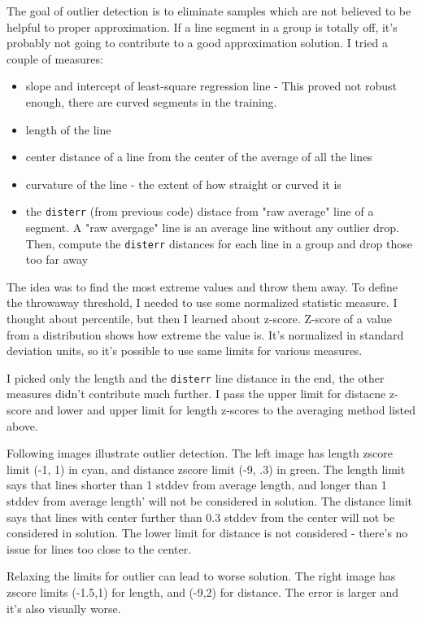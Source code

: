 \documentclass[11pt]{article}
\providecommand{\tightlist}{%
      \setlength{\itemsep}{0pt}\setlength{\parskip}{0pt}}
\begin{document}
The goal of outlier detection is to eliminate samples which are not
believed to be helpful to proper approximation. If a line segment in a
group is totally off, it's probably not going to contribute to a good
approximation solution. I tried a couple of measures:

\begin{itemize}
\tightlist
\item
  slope and intercept of least-square regression line - This proved not
  robust enough, there are curved segments in the training.
\item
  length of the line
\item
  center distance of a line from the center of the average of all the
  lines
\item
  curvature of the line - the extent of how straight or curved it is
\item
  the \texttt{disterr} (from previous code) distace from "raw average"
  line of a segment. A "raw avergage" line is an average line without
  any outlier drop. Then, compute the \texttt{disterr} distances for
  each line in a group and drop those too far away
\end{itemize}

The idea was to find the most extreme values and throw them away. To
define the throwaway threshold, I needed to use some normalized
statistic measure. I thought about percentile, but then I learned about
z-score. Z-score of a value from a distribution shows how extreme the
value is. It's normalized in standard deviation units, so it's possible
to use same limits for various measures.

I picked only the length and the \texttt{disterr} line distance in the
end, the other measures didn't contribute much further. I pass the upper
limit for distacne z-score and lower and upper limit for length z-scores
to the averaging method listed above.

Following images illustrate outlier detection. The left image has length
zscore limit (-1, 1) in cyan, and distance zscore limit (-9, .3) in
green. The length limit says that lines shorter than 1 stddev from
average length, and longer than 1 stddev from average length' will not
be considered in solution. The distance limit says that lines with
center further than 0.3 stddev from the center will not be considered in
solution. The lower limit for distance is not considered - there's no
issue for lines too close to the center.

Relaxing the limits for outlier can lead to worse solution. The right
image has zscore limits (-1.5,1) for length, and (-9,2) for distance.
The error is larger and it's also visually worse.
\end{document}
